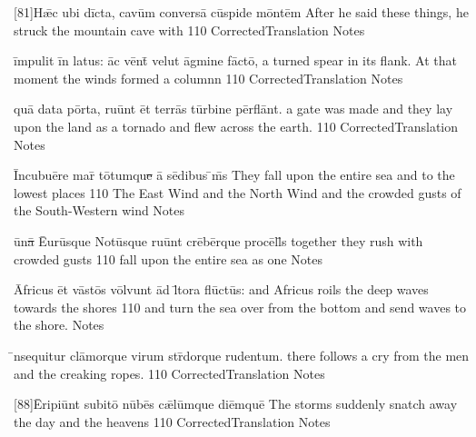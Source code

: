 \latline
  {[81]H\={\ae}c \-ub\-i d\=ict\-a, c\-av\=um c\-onv\-ers\={\macron a} c\=usp\-id\-e m\=ont\=em
}
  { After he said these things, he struck the mountain cave with }
  {110}
  { CorrectedTranslation }
  { Notes }


\latline
  {\=imp\-ul\-it \=in l\-at\-us:  \=ac v\=ent\={\macron {\i}} v\-el\-ut \=agm\-in\-e f\=act\={\macron o},
}
  { a turned spear in its flank.  At that moment the winds formed a columnn }
  {110}
  { CorrectedTranslation }
  { Notes }


\latline
  {qu\={\macron a} d\-at\-a p\=ort\-a, r\-u\=unt \=et t\-err\={\macron a}s t\=urb\-in\-e p\=erfl\=ant.
}
  { a gate was made and they lay upon the land as a tornado and flew across the earth. }
  {110}
  { CorrectedTranslation }
  { Notes }

	\latline
	  {\=Inc\-ub\-u\={\macron e}r\-e m\-ar\={\macron {\i}} t\={\macron o}tumqu\sout{e }\={\macron a} s\={\macron e}d\-ib\-us \={\macron {\i}}m\={\macron {\i}}s
	}  { They fall upon the entire sea and to the lowest places }
	  {110}
	  { The East Wind and the North Wind and the crowded gusts of the South-Western wind  }
	  { Notes }


	\latline
	  {\={\macron u}n\sout{\={\macron a} }\={Eu}r\=usqu\-e N\-ot\=usqu\-e r\-u\=unt cr\={\macron e}b\=erqu\-e pr\-oc\=ell\={\macron {\i}}s
	}
	  { together they rush with crowded gusts }
	  {110}
	  { fall upon the entire sea as one }
	  { Notes }
	

	\latline
	  {\={\macron A}fr\-ic\-us \=et v\=ast\={\macron o}s v\=olvunt \=ad l\={\macron {\i}}t\-or\-a fl\={\macron u}ct\={\macron u}s:
	}
	  { and Africus roils the deep waves towards the shores }
	  {110}
	  { and turn the sea over from the bottom and send waves to the shore. }
	  { Notes }


	\latline
	  {\={\macron {\i}}nsequitur cl\={\macron a}morque virum str\={\macron {\i}}dorque rudentum.
	}
	  { there follows a cry from the men and the creaking ropes. }
	  {110}
	  { CorrectedTranslation }
	  { Notes }

	\latline
	  {[88]\={\macron E}r\-ip\-i\=unt s\-ub\-it\={\macron o} n\={\macron u}b\={\macron e}s c\={\ae}l\=umqu\-e d\-i\=emqu\=e
	}
	  { The storms suddenly snatch away the day and the heavens }
	  {110}
	  { CorrectedTranslation }
	  { Notes }